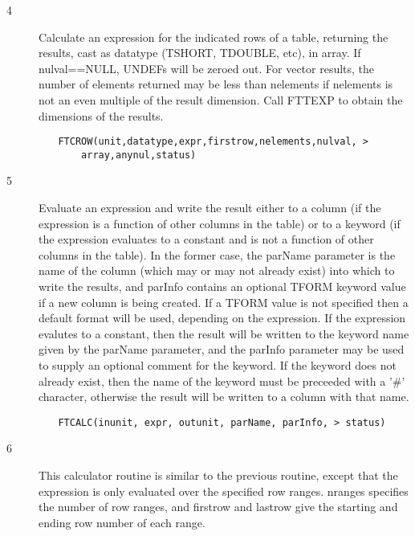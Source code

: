 \documentclass[11pt]{book}
\begin{document}
\begin{description}
\item[4 ] Calculate an expression for the indicated rows of a table, returning
the results, cast as datatype (TSHORT, TDOUBLE, etc), in array.  If
nulval==NULL, UNDEFs will be zeroed out.  For vector results, the number
of elements returned may be less than nelements if nelements is not an
even multiple of the result dimension.  Call FTTEXP to obtain
the dimensions of the results.
\end{description}

\begin{verbatim}
         FTCROW(unit,datatype,expr,firstrow,nelements,nulval, >
             array,anynul,status)
\end{verbatim}

\begin{description}
\item[5 ]Evaluate an expression and write the result either to a column (if
the expression is a function of other columns in the table) or to a
keyword (if the expression evaluates to a constant and is not a
function of other columns in the table).  In the former case, the
parName parameter is the name of the column (which may or may not already
exist) into which to write the results, and parInfo contains an
optional TFORM keyword value if a new column is being created.  If a
TFORM value is not specified then a default format will be used,
depending on the expression.  If the expression evalutes to a constant,
then the result will be written to the keyword name given by the
parName parameter, and the parInfo parameter may be used to supply an
optional comment for the keyword.  If the keyword does not already
exist, then the name of the keyword must be preceeded with a '\#' character,
otherwise the result will be written to a column with that name.
\end{description}


\begin{verbatim}
         FTCALC(inunit, expr, outunit, parName, parInfo, > status)
\end{verbatim}

\begin{description}
\item[6 ] This calculator routine is similar to the previous routine, except
that the expression is only evaluated over the specified
row ranges.  nranges specifies the number of row ranges, and firstrow
and lastrow give the starting and ending row number of each range.
\end{description}
\end{document}
